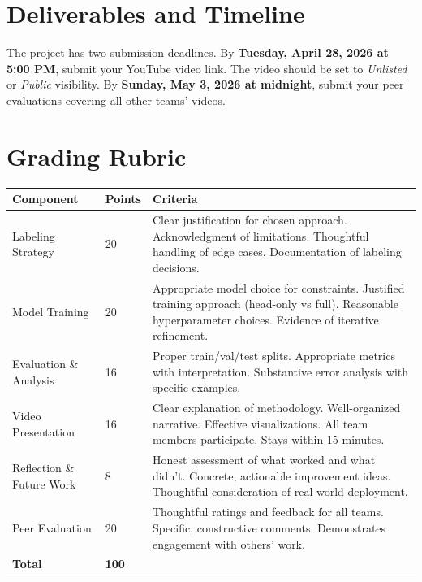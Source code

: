 \documentclass[11pt]{article}
\begin{document}
%

\section*{Deliverables and Timeline}

The project has two submission deadlines. By \textbf{Tuesday, April 28, 2026 at 5:00 PM}, submit your YouTube video link. The video should be set to \textit{Unlisted} or \textit{Public} visibility. By \textbf{Sunday, May 3, 2026 at midnight}, submit your peer evaluations covering all other teams' videos.

\section*{Grading Rubric}

\begin{center}
\begin{tabular}{p{4cm}lp{10cm}}
\toprule
\textbf{Component} & \textbf{Points} & \textbf{Criteria} \\
\midrule
Labeling Strategy & 20 & Clear justification for chosen approach. Acknowledgment of limitations. Thoughtful handling of edge cases. Documentation of labeling decisions. \\
\addlinespace
Model Training & 20 & Appropriate model choice for constraints. Justified training approach (head-only vs full). Reasonable hyperparameter choices. Evidence of iterative refinement. \\
\addlinespace
Evaluation \& Analysis & 16 & Proper train/val/test splits. Appropriate metrics with interpretation. Substantive error analysis with specific examples. \\
\addlinespace
Video Presentation & 16 & Clear explanation of methodology. Well-organized narrative. Effective visualizations. All team members participate. Stays within 15 minutes. \\
\addlinespace
Reflection \& Future Work & 8 & Honest assessment of what worked and what didn't. Concrete, actionable improvement ideas. Thoughtful consideration of real-world deployment. \\
\addlinespace
Peer Evaluation & 20 & Thoughtful ratings and feedback for all teams. Specific, constructive comments. Demonstrates engagement with others' work. \\
\midrule
\textbf{Total} & \textbf{100} & \\
\bottomrule
\end{tabular}
\end{center}
\end{document}
